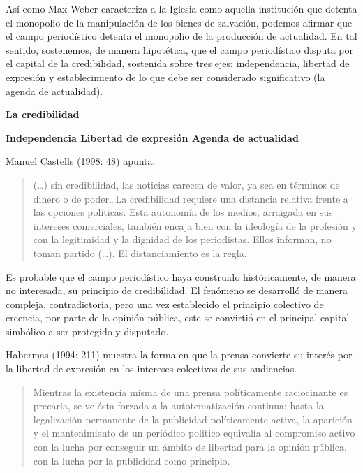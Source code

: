 Así como Max Weber caracteriza a la Iglesia como aquella institución que detenta el monopolio de la manipulación de los bienes de salvación, podemos afirmar que el campo periodístico detenta el monopolio de la producción de actualidad. En tal sentido, sostenemos, de manera hipotética, que el campo periodístico disputa por el capital de la credibilidad, sostenida sobre tres ejes: independencia, libertad de expresión y establecimiento de lo que debe ser considerado significativo (la agenda de actualidad).

\textbf{La credibilidad}

\textbf{ Independencia Libertad de expresión Agenda de actualidad }

Manuel Castells (1998: 48) apunta:

\begin{quote}
	(\dots) sin credibilidad, las noticias carecen de valor, ya sea en términos de dinero o de poder\dots La credibilidad requiere una distancia relativa frente a las opciones políticas. Esta autonomía de los medios, arraigada en sus intereses comerciales, también encaja bien con la ideología de la profesión y con la legitimidad y la dignidad de los periodistas. Ellos informan, no toman partido (\dots). El distanciamiento es la regla.
\end{quote}


Es probable que el campo periodístico haya construido históricamente, de manera no interesada, su principio de credibilidad. El fenómeno se desarrolló de manera compleja, contradictoria, pero una vez establecido el principio colectivo de creencia, por parte de la opinión pública, este se convirtió en el principal capital simbólico a ser protegido y disputado.

Habermas (1994: 211) muestra la forma en que la prensa convierte su interés por la libertad de expresión en los intereses colectivos de sus audiencias.

\begin{quote}
	Mientras la existencia misma de una prensa políticamente raciocinante es precaria, se ve ésta forzada a la autotematización continua: hasta la legalización permanente de la publicidad políticamente activa, la aparición y el mantenimiento de un periódico político equivalía al compromiso activo con la lucha por conseguir un ámbito de libertad para la opinión pública, con la lucha por la publicidad como principio.
\end{quote}



